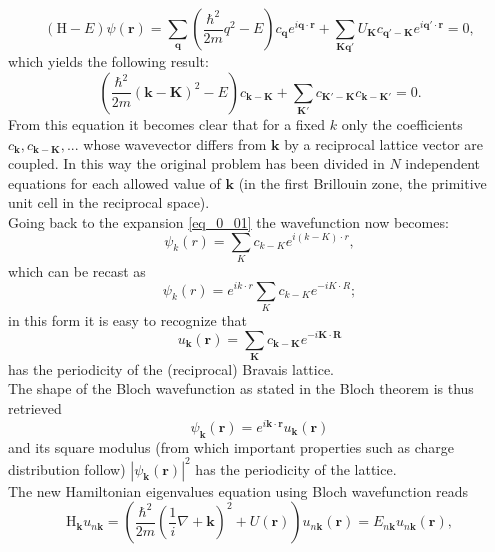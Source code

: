 \documentclass[12pt, a4paper]{report}
\numberwithin{equation}{section}
\begin{document}
\begin{equation}
    (\mathrm{H}-E)\psi(\mathbf{r})=\sum_\mathbf{q}\left(\frac{\hbar^2}{2m}q^2-E\right)c_\mathbf{q}e^{i\mathbf{q}\cdot\mathbf{r}}+\sum_{\mathbf{K}\mathbf{q}'}U_\mathbf{K}c_{\mathbf{q}'-\mathbf{K}}e^{i\mathbf{q}'\cdot\mathbf{r}}=0,
\end{equation}
which yields the following result:
\begin{equation}
    \left(\frac{\hbar^2}{2m}(\mathbf{k}-\mathbf{K})^2-E\right)c_{\mathbf{k}-\mathbf{K}}+\sum_{\mathbf{K}'}c_{\mathbf{K}'-\mathbf{K}}c_{\mathbf{k}-\mathbf{K}'}=0.
\end{equation}
From this equation it becomes clear that for a fixed $k$ only the coefficients $c_\mathbf{k},c_{\mathbf{k}-\mathbf{K}},...$ whose wavevector differs from 
$\mathbf{k}$ by a reciprocal lattice vector are coupled. In this way the original problem has been divided in $N$ independent equations for 
each allowed value of $\mathbf{k}$ (in the first Brillouin zone, the primitive unit cell in the reciprocal space).\\
Going back to the expansion \ref{eq_0_01} the wavefunction now becomes:
\begin{equation}
    \psi_k(r)=\sum_{K}c_{k-K}e^{i(k-K)\cdot r},
\end{equation}
which can be recast as 
\begin{equation}
    \psi_k(r)=e^{ik\cdot r}\sum_{K}c_{k-K}e^{-iK\cdot R};
\end{equation}
in this form it is easy to recognize that 
\begin{equation}
    u_\mathbf{k}(\mathbf{r})=\sum_\mathbf{K}c_{\mathbf{k}-\mathbf{K}}e^{-i\mathbf{K}\cdot\mathbf{R}}
\end{equation}
has the periodicity of the (reciprocal) Bravais lattice.\\
The shape of the Bloch wavefunction as stated in the Bloch theorem is thus retrieved
\begin{equation}
    \psi_\mathbf{k}(\mathbf{r})=e^{i\mathbf{k}\cdot \mathbf{r}}u_\mathbf{k}(\mathbf{r})
\end{equation}
and its square modulus (from which important properties such as charge distribution follow) $|\psi_\mathbf{k}(\mathbf{r})|^2$ has the periodicity of the
lattice.\\
The new Hamiltonian eigenvalues equation using Bloch wavefunction reads
\begin{equation}
    \mathrm{H}_\mathbf{k} u_{n\mathbf{k}}=\left(\frac{\hbar^2}{2m}\left(\frac{1}{i}\nabla+\mathbf{k}\right)^2+U(\mathbf{r})\right)u_{n\mathbf{k}}(\mathbf{r})=E_{n\mathbf{k}}u_{n\mathbf{k}}(\mathbf{r}),
\end{equation}
\end{document}
